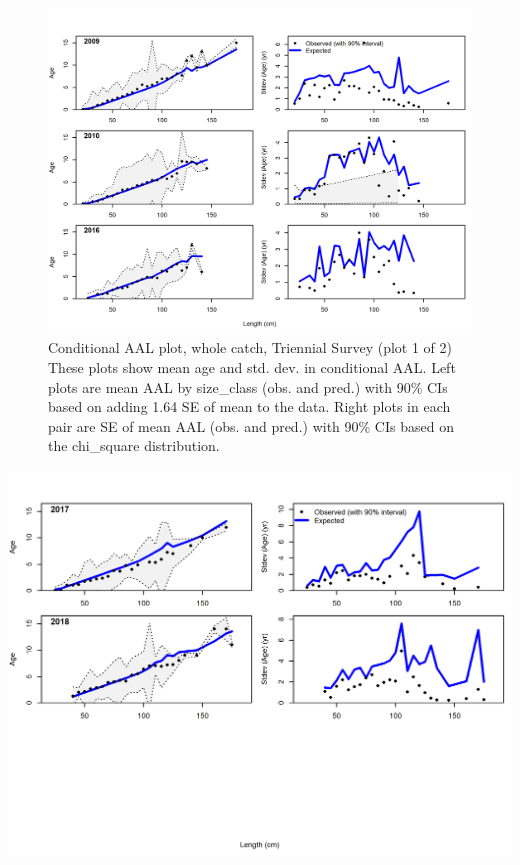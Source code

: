 \documentclass[12pt,]{article}
\begin{document}
\begin{figure}
\centering
\includegraphics{./r4ss/plots_mod1/comp_condAALfit_Andre_plotsflt5mkt0_page1.png}
\caption{Conditional AAL plot, whole catch, Triennial Survey (plot 1 of
2) These plots show mean age and std. dev. in conditional AAL. Left
plots are mean AAL by size\_class (obs. and pred.) with 90\% CIs based
on adding 1.64 SE of mean to the data. Right plots in each pair are SE
of mean AAL (obs. and pred.) with 90\% CIs based on the chi\_square
distribution.
\label{fig:mod1_8_comp_condAALfit_Andre_plotsflt5mkt0_page1}}
\end{figure}

\includegraphics{./r4ss/plots_mod1/comp_condAALfit_Andre_plotsflt5mkt0_page2.png}
\end{document}
